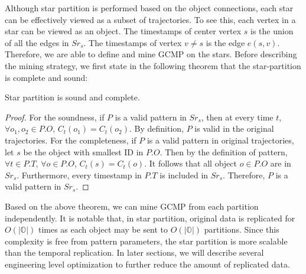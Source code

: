 Although star partition is performed based on the object connections, each star
can be effectively viewed as a subset of trajectories. To see this, each vertex
in a star can be viewed as an object. The timestamps of center vertex $s$ is the
union of all the edges in $Sr_s$. The timestamps of vertex $v \neq s$ is the 
edge $e(s,v)$. Therefore, we are able to define and mine GCMP on the stars. 
Before describing the mining strategy, we first state in the following theorem that 
the star-partition is complete and sound:
\begin{theorem}
Star partition is sound and complete.
\end{theorem}

\begin{proof}
For the soundness,
if $P$ is a valid pattern in $Sr_s$, then at every time $t$, $\forall o_1, o_2 \in P.O$, $C_t(o_1) = C_t(o_2)$.
By definition, $P$ is valid in the original trajectories.
For the completeness,
if $P$ is a valid pattern in original trajectories, let $s$ be the object with smallest ID in $P.O$. 
Then by the definition of pattern, $\forall t \in P.T$, $\forall o \in P.O$, $C_t(s) = C_t(o)$.
It follows that all object $o \in P.O$ are in $Sr_s$. Furthermore, every timestamp in $P.T$ is included
in $Sr_s$. Therefore, $P$ is a valid pattern in $Sr_s$.
\end{proof}

Based on the above theorem, we can mine GCMP from each partition independently.
It is notable that, in star partition, original data is replicated for $O(|\mathbb{O}|)$ times
as each object may be sent to $O(|\mathbb{O}|)$ partitions. Since this complexity is free
from pattern parameters, the star partition is more scalable than the temporal replication.
In later sections, we will describe several engineering level optimization to further reduce the amount of replicated data.

